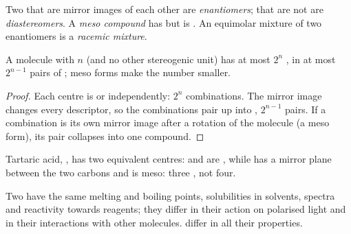 \begin{definition}\label{def:b1:stereochemistry-in-depth:enantiomers}
Two  that are mirror images of each other are
\emph{enantiomers};  that are not are
\emph{diastereomers}. A \emph{meso
compound} has  but is . An
equimolar mixture of two enantiomers is a \emph{racemic
mixture}.
\end{definition}

\begin{proposition}\label{prop:b1:stereochemistry-in-depth:max-stereoisomers}
A molecule with $n$  (and no other stereogenic unit)
has at most $2^n$ , in at most $2^{n-1}$ pairs of
; meso forms make the number smaller.
\end{proposition}

\begin{proof}
Each centre is  or  independently: $2^n$ combinations. The
mirror image changes every descriptor, so the combinations pair up into
, $2^{n-1}$ pairs. If a combination is its own mirror image
after a rotation of the molecule (a meso form), its pair collapses into
one compound.
\end{proof}

Tartaric acid, , has two equivalent centres:
 and  are , while  has a mirror
plane between the two carbons and is meso: three , not four.

\begin{proposition}\label{prop:b1:stereochemistry-in-depth:enantiomer-properties}
Two  have the same melting and boiling points, solubilities
in  solvents, spectra and reactivity towards  reagents;
they differ in their action on polarised light and in their interactions
with other  molecules.  differ in all their
properties.
\end{proposition}

